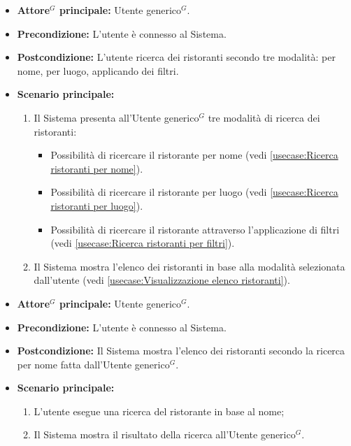 \label{usecase:Ricerca di ristoranti}
\begin{itemize}
	\item \textbf{\gls{Attore}$^G$ principale:} \gls{Utente generico}$^G$.

	\item \textbf{Precondizione:}
	      L'utente è connesso al Sistema.

	\item \textbf{Postcondizione:} L'utente ricerca dei ristoranti secondo tre modalità: per nome, per luogo, applicando dei filtri.

	\item \textbf{Scenario principale:}
	      \begin{enumerate}
		      \item Il Sistema presenta all'\gls{Utente generico}$^G$ tre modalità di ricerca dei ristoranti:
		            \begin{itemize}
			            \item Possibilità di ricercare il ristorante per nome (vedi \autoref{usecase:Ricerca ristoranti per nome}).
			            \item Possibilità di ricercare il ristorante per luogo (vedi \autoref{usecase:Ricerca ristoranti per luogo}).
			            \item Possibilità di ricercare il ristorante attraverso l'applicazione di filtri (vedi \autoref{usecase:Ricerca ristoranti per filtri}).
		            \end{itemize}

		      \item Il Sistema mostra l'elenco dei ristoranti in base alla modalità selezionata dall'utente (vedi \autoref{usecase:Visualizzazione elenco ristoranti}).

	      \end{enumerate}
\end{itemize}


\label{usecase:Ricerca ristoranti per nome}
\begin{itemize}
	\item \textbf{\gls{Attore}$^G$ principale:} \gls{Utente generico}$^G$.

	\item \textbf{Precondizione:} L'utente è connesso al Sistema.

	\item \textbf{Postcondizione:} Il Sistema mostra l'elenco dei ristoranti secondo la ricerca per nome fatta dall'\gls{Utente generico}$^G$.

	\item \textbf{Scenario principale:}
	      \begin{enumerate}
		      \item L'utente esegue una ricerca del ristorante in base al nome;
		      \item Il Sistema mostra il risultato della ricerca all'\gls{Utente generico}$^G$.
	      \end{enumerate}
\end{itemize}

